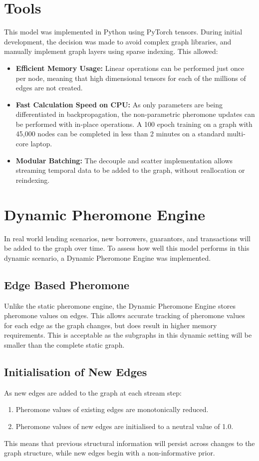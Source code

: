 \section[Tools]{Tools}
\label{sec:tools_tech}
\label{sec:tooling}

This model was implemented in Python using PyTorch tensors. During initial development, the decision was made to avoid complex graph libraries, and manually implement graph layers using sparse indexing. This allowed:
\begin{itemize}
    \item \textbf{Efficient Memory Usage:} Linear operations can be performed just once per node, meaning that high dimensional tensors for each of the millions of edges are not created.
    \item \textbf{Fast Calculation Speed on CPU:} As only parameters are being differentiated in backpropagation, the non-parametric pheromone updates can be performed with in-place operations. A 100 epoch training on a graph with 45,000 nodes can be completed in less than 2 minutes on a standard multi-core laptop.
    \item \textbf{Modular Batching:} The decouple and scatter implementation allows streaming temporal data to be added to the graph, without reallocation or reindexing.
\end{itemize}

\section[Dynamic Pheromone Engine]{Dynamic Pheromone Engine}
\label{sec:dynamic_engine}

In real world lending scenarios, new borrowers, guarantors, and transactions will be added to the graph over time. To assess how well this model performs in this dynamic scenario, a Dynamic Pheromone Engine was implemented.

\subsection{Edge Based Pheromone}
Unlike the static pheromone engine, the Dynamic Pheromone Engine stores pheromone values on edges. This allows accurate tracking of pheromone values for each edge as the graph changes, but does result in higher memory requirements. This is acceptable as the subgraphs in this dynamic setting will be smaller than the complete static graph.

\subsection{Initialisation of New Edges}
As new edges are added to the graph at each stream step:
\begin{enumerate}
    \item Pheromone values of existing edges are monotonically reduced.
    \item Pheromone values of new edges are initialised to a neutral value of 1.0.
\end{enumerate}
This means that previous structural information will persist across changes to the graph structure, while new edges begin with a non-informative prior.

